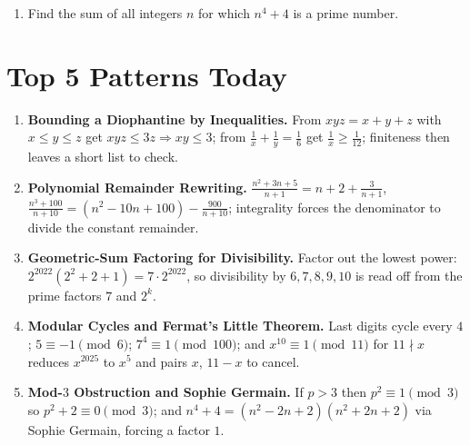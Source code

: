 \documentclass[11pt,a4paper]{article}
\begin{document}
\begin{enumerate}

\item Find the sum of all integers $n$ for which $n^4 + 4$ is a prime number.


\end{enumerate}

\section*{Top 5 Patterns Today}

\begin{enumerate}[leftmargin=2em, itemsep=4pt]
  \item \textbf{Bounding a Diophantine by Inequalities.}
        From $xyz=x+y+z$ with $x\le y\le z$ get $xyz\le3z\Rightarrow xy\le3$; from $\frac1x+\frac1y=\frac16$ get $\frac1x\ge\frac1{12}$; finiteness then leaves a short list to check. 
  \item \textbf{Polynomial Remainder Rewriting.}
        $\frac{n^{2}+3n+5}{n+1}=n+2+\frac3{n+1}$, $\frac{n^{3}+100}{n+10}=(n^{2}-10n+100)-\frac{900}{n+10}$; integrality forces the denominator to divide the constant remainder. 
  \item \textbf{Geometric-Sum Factoring for Divisibility.}
        Factor out the lowest power: $2^{2022}(2^{2}+2+1)=7\cdot2^{2022}$, so divisibility by $6,7,8,9,10$ is read off from the prime factors $7$ and $2^{k}$. 
  \item \textbf{Modular Cycles and Fermat's Little Theorem.}
        Last digits cycle every $4$; $5\equiv-1\pmod6$; $7^{4}\equiv1\pmod{100}$; and $x^{10}\equiv1\pmod{11}$ for $11\nmid x$ reduces $x^{2025}$ to $x^{5}$ and pairs $x$, $11-x$ to cancel. 
  \item \textbf{Mod-$3$ Obstruction and Sophie Germain.}
        If $p>3$ then $p^{2}\equiv1\pmod3$ so $p^{2}+2\equiv0\pmod3$; and $n^{4}+4=(n^{2}-2n+2)(n^{2}+2n+2)$ via Sophie Germain, forcing a factor $1$. 
\end{enumerate}
\end{document}
